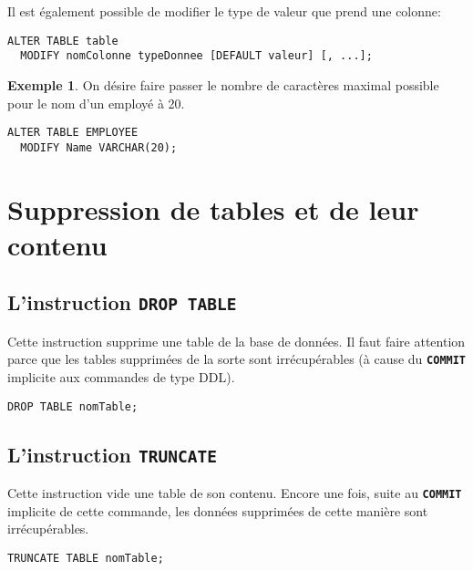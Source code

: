 \documentclass[a4paper, 12pt]{report}
\newcommand{\textSQL}[1]{\texttt{\textbf{#1}}}
\theoremstyle{definition} \newtheorem{ex}{Exemple}
\begin{document}
Il est également possible de modifier le type de valeur que prend une colonne:
\begin{lstlisting}[frame=single]
ALTER TABLE table
  MODIFY nomColonne typeDonnee [DEFAULT valeur] [, ...];
\end{lstlisting}
\begin{ex}
On désire faire passer le nombre de caractères maximal possible pour le nom d'un employé à 20.
\begin{lstlisting}[frame=single]
ALTER TABLE EMPLOYEE
  MODIFY Name VARCHAR(20);
\end{lstlisting}
\end{ex}

\section{Suppression de tables et de leur contenu}
\subsection{L'instruction \textSQL{DROP TABLE}}
Cette instruction supprime une table de la base de données. Il faut faire attention parce que les tables supprimées de la sorte sont irrécupérables (à cause du \textSQL{COMMIT} implicite aux commandes de type DDL).
\begin{lstlisting}[frame=single]
DROP TABLE nomTable;
\end{lstlisting}

\subsection{L'instruction \textSQL{TRUNCATE}}
Cette instruction vide une table de son contenu. Encore une fois, suite au \textSQL{COMMIT} implicite de cette commande, les données supprimées de cette manière sont irrécupérables.
\begin{lstlisting}[frame=single]
TRUNCATE TABLE nomTable;
\end{lstlisting}
\end{document}
